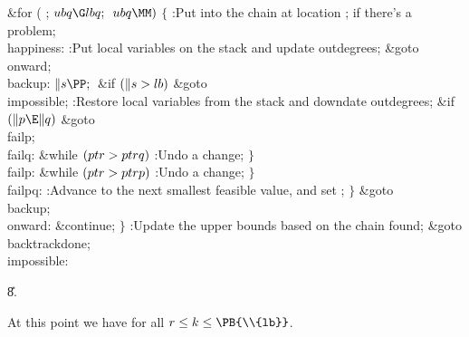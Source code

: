 \&{for} ( ; ${}\\{ubq}\G\\{lbq};{}$ ${}\\{ubq}\MM){}$\5
${}\{{}$\1\6
:Put  into the chain at location ;  if there's a problem\X;\6
\4\\{happiness}:\5
:Put local variables on the stack and update outdegrees\X;\6
\&{goto} \\{onward};\6
\4\\{backup}:\5
${}\|s\PP;{}$\6
\&{if} ${}(\|s>\\{lb}){}$\1\5
\&{goto} \\{impossible};\2\6
:Restore local variables from the stack and downdate outdegrees\X;\6
\&{if} ${}(\|p\E\|q){}$\1\5
\&{goto} \\{failp};\2\6
\4\\{failq}:\5
\&{while} ${}(\\{ptr}>\\{ptrq}){}$\1\5
:Undo a change\X;\2\6
\4${}\}{}$\2\6
\4\\{failp}:\5
\&{while} ${}(\\{ptr}>\\{ptrp}){}$\1\5
:Undo a change\X;\2\6
\4${}\}{}$\2\6
\4\\{failpq}:\5
:Advance  to the next smallest feasible value, and set \X;\6
\4${}\}{}$\2\6
\&{goto} \\{backup};\6
\4\\{onward}:\5
\&{continue};\6
\4${}\}{}$\2\6
:Update the upper bounds based on the chain found\X;\6
\&{goto} \\{backtrackdone};\6
\4\\{impossible}:\par
\U8.\fi

At this point we have  for all $r\le k\le\PB{%
\\{lb}}$.

